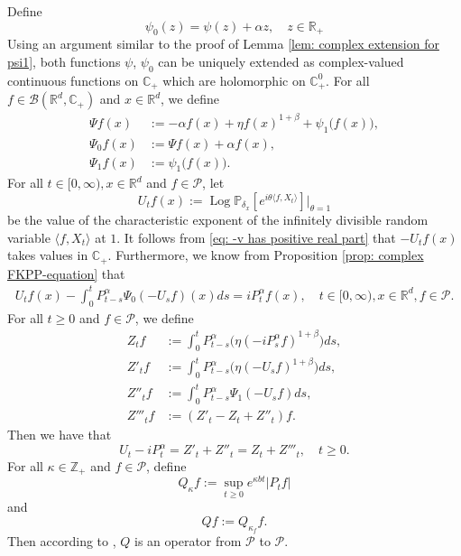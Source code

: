 \documentclass[12pt,a4paper]{amsart}
\theoremstyle{plain}
\theoremstyle{definition}
\numberwithin{equation}{section}
\begin{document}
     Define
\begin{equation}
\label{eq: psi 0}
    \psi_0(z)=\psi(z)+\alpha z,\quad z\in \mathbb{R}_+
\end{equation}
  Using an argument similar to the proof  of Lemma \ref{lem: complex extension for psi1},
    both functions $\psi$, $\psi_0$ can be uniquely extended as complex-valued continuous functions on $\mathbb C_+$ which are holomorphic on $\mathbb C^0_+$.
    For all $f\in \mathcal B(\mathbb R^d, \mathbb C_+)$ and $x\in \mathbb R^d$, we define
\begin{align}
\label{eq: def of operator Psi}
    \Psi f (x) &:= -\alpha f(x) + \eta f(x)^{1+\beta} + \psi_1\big(f(x)\big),
    \\\Psi_0 f(x) &:= \Psi f(x) + \alpha f(x),
    \\ \Psi_1 f(x) &:= \psi_1 \big(f(x)\big).
\end{align}
    For all $t\in [0,\infty), x\in \mathbb R^d $ and $f \in \mathcal{P}$, let
\begin{equation}\label{eq: def of U_t}
    U_tf(x) := \operatorname{Log} \mathbb P_{\delta_x}[e^{i\theta \langle f, X_t\rangle}]|_{\theta = 1}
\end{equation}
    be the value of the characteristic exponent of the infinitely divisible random variable $\langle f, X_t\rangle$ at $1$.
    It follows from \eqref{eq: -v has positive real part} that $-U_tf(x)$ takes values in $\mathbb C_+$. Furthermore, we know from Proposition \ref{prop: complex FKPP-equation} that
\begin{align}
\label{eq:chareq2}
    U_tf(x)-\int_0^t P^\alpha_{t-s} \Psi_0(-U_sf)(x)ds
    =i P^{\alpha}_t f(x),
    \quad t\in [0,\infty), x\in \mathbb{R}^d, f\in \mathcal P.
\end{align}
       For all $t\geq 0$ and $f\in \mathcal P$, we define
\begin{align}
\label{eq: def of Zf}
    Z_t f
    &:= \int_0^t P^\alpha_{t-s}\big( \eta (-i P^\alpha_sf)^{1+\beta}\big)ds,
    \\ Z'_t f
    &:= \int_0^t P^\alpha_{t-s}\big( \eta (-U_s f)^{1+\beta}\big)ds,
    \\ Z''_t f
    &:= \int_0^t P^\alpha_{t-s}\Psi_1(-U_s f)ds,
    \\ Z'''_t f
    &:= (Z'_t - Z_t+ Z''_t)f.
\end{align}
    Then we have that
\begin{equation}
\label{eq: key equality}
    U_t - i P^\alpha_t
    = Z'_t + Z''_t
    = Z_t+Z'''_t, \quad t\geq 0.
\end{equation}
	For all $\kappa \in \mathbb Z_+$ and $f\in \mathcal P$, define
\begin{equation}\label{Q_k}
    Q_\kappa f
    := \sup_{t\geq 0} e^{\kappa b t}|P_t f|
\end{equation}
    and
\begin{equation}\label{Q}
    Q f:= Q_{\kappa_f}f.
\end{equation}
    Then according to \cite[Fact 1.2]{MarksMilos2018CLT}, $Q$ is an operator from $\mathcal P$ to $\mathcal P$.
\end{document}
